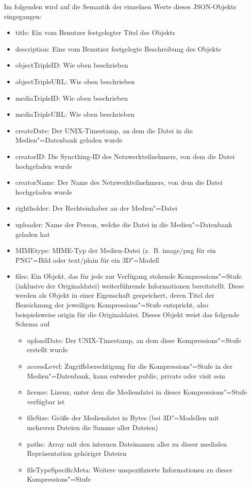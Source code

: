 Im folgenden wird auf die Semantik der einzelnen Werte dieses JSON-Objekts eingegangen:
\begin{itemize}
\item {\ttfamily title}: Ein vom Benutzer festgelegter Titel des Objekts
\item {\ttfamily description}: Eine vom Benutzer festgelegte Beschreibung des Objekts
\item {\ttfamily objectTripleID}: Wie oben beschrieben
\item {\ttfamily objectTripleURL}: Wie oben beschrieben
\item {\ttfamily mediaTripleID}: Wie oben beschrieben
\item {\ttfamily mediaTripleURL}: Wie oben beschrieben
\item {\ttfamily createDate}: Der UNIX-Timestamp, an dem die Datei in die Medien"=Datenbank geladen wurde
\item {\ttfamily creatorID}: Die Syncthing-ID des Netzwerkteilnehmers, von dem die Datei hochgeladen wurde
\item {\ttfamily creatorName}: Der Name des Netzwerkteilnehmers, von dem die Datei hochgeladen wurde
\item {\ttfamily rightholder}: Der Rechteinhaber an der Medien"=Datei
\item {\ttfamily uploader}: Name der Person, welche die Datei in die Medien"=Datenbank geladen hat
\item {\ttfamily MIMEtype}: MIME-Typ der Medien-Datei (z.~B. \glqq{}image/png\grqq{} für ein PNG"=Bild oder \glqq{}text/plain\grqq{} für ein 3D"=Modell
\item {\ttfamily files}: Ein Objekt, das für jede zur Verfügung stehende Kompressions"=Stufe (inklusive der Originaldatei) weiterführende Informationen bereitstellt. Diese werden als Objekt in einer Eigenschaft gespeichert, deren Titel der Bezeichnung der jeweiligen Kompressions"=Stufe entspricht, also beispielsweise {\ttfamily origin} für die Originaldatei. Dieses Objekt weist das folgende Schema auf
	\begin{itemize}
	\item {\ttfamily uploadDate}: Der UNIX-Timestamp, an dem diese Kompressions"=Stufe erstellt wurde
	\item {\ttfamily accessLevel}: Zugriffsberechtigung für die Kompressions"=Stufe in der Medien"=Datenbank, kann entweder {\ttfamily public}, {\ttfamily private} oder {\ttfamily visit} sein
	\item {\ttfamily license}: Lizenz, unter dem die Mediendatei in dieser Kompressions"=Stufe verfügbar ist
	\item {\ttfamily fileSize}: Größe der Mediendatei in Bytes (bei 3D"=Modellen mit mehreren Dateien die Summe aller Dateien)
	\item {\ttfamily paths}: Array mit den internen Dateinamen aller zu dieser medialen Repräsentation gehöriger Dateien
	\item {\ttfamily fileTypeSpecificMeta}: Weitere unspezifizierte Informationen zu dieser Kompressions"=Stufe
	\end{itemize}
\end{itemize}

